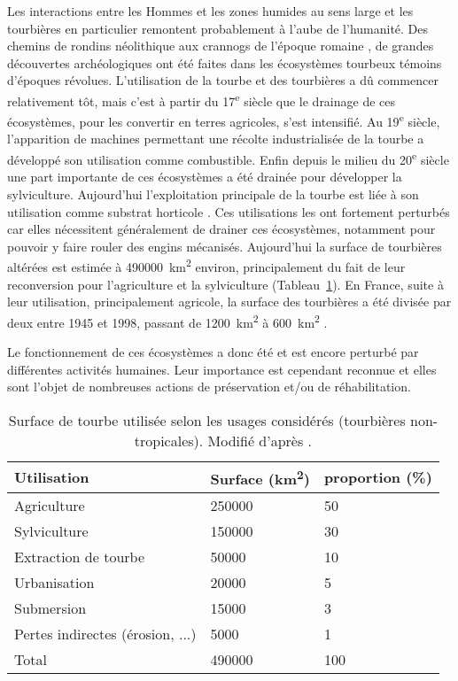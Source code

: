 Les interactions entre les Hommes et les zones humides au sens large et les tourbières en particulier remontent probablement à l'aube de l'humanité.
Des chemins de rondins néolithique aux crannogs de l'époque romaine \citep{buckland1993}, de grandes découvertes archéologiques ont été faites dans les écosystèmes tourbeux témoins d'époques révolues.
L’utilisation de la tourbe et des tourbières a dû commencer relativement tôt, mais c'est à partir du 17\textsuperscript{e} siècle que le drainage de ces écosystèmes, pour les convertir en terres agricoles, s'est intensifié.
Au 19\textsuperscript{e} siècle, l'apparition de machines permettant une récolte industrialisée de la tourbe a développé son utilisation comme combustible.
Enfin depuis le milieu du 20\textsuperscript{e} siècle une part importante de ces écosystèmes a été drainée pour développer la sylviculture.
Aujourd'hui l'exploitation principale de la tourbe est liée à son utilisation comme substrat horticole \citep{lappalainen1996,chapman2003}.
Ces utilisations les ont fortement perturbés car elles nécessitent généralement de drainer ces écosystèmes, notamment pour pouvoir y faire rouler des engins mécanisés.
Aujourd'hui la surface de tourbières altérées est estimée à \SI{490000}{\square\kilo\metre} environ, principalement du fait de leur reconversion pour l'agriculture et la sylviculture (Tableau~\ref{table:tourbeUsage}).
En France, suite à leur utilisation, principalement agricole, la surface des tourbières a été divisée par deux entre 1945 et 1998, passant de \SI{1200}{\square\kilo\meter} à \SI{600}{\square\kilo\meter} \citep{lappalainen1996,manneville1999}.

Le fonctionnement de ces écosystèmes a donc été et est encore perturbé par différentes activités humaines.
Leur importance est cependant reconnue et elles sont l'objet de nombreuses actions de préservation et/ou de réhabilitation.
\begin{table}[]
\centering
\caption{Surface de tourbe utilisée selon les usages considérés (tourbières non-tropicales). Modifié d'après \citet{joosten2002}.}
\label{table:tourbeUsage}
\begin{tabular}{lll}\toprule
Utilisation & Surface (\si{\square\kilo\meter})  & proportion (\%) \\ \midrule
Agriculture & \num{250000} & \num{50} \\ 
Sylviculture & \num{150000} & \num{30}\\ 
Extraction de tourbe & \num{50000} & \num{10}\\ 
Urbanisation & \num{20000} & \num{5}\\ 
Submersion & \num{15000} & \num{3}\\ 
Pertes indirectes (érosion, ...) & \num{5000} & \num{1}\\[1ex]
Total & \num{490000} & \num{100}\\
\bottomrule
\end{tabular}
\end{table}


